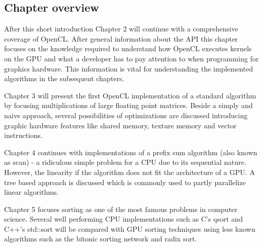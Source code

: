 \subsection{Chapter overview}

After this short introduction Chapter 2 will continue with a comprehensive coverage of OpenCL. After general information about the API this chapter focuses on the knowledge required to understand how OpenCL executes kernels on the GPU and what a developer has to pay attention to when programming for graphics hardware. This information is vital for understanding the implemented algorithms in the subsequent chapters.

Chapter 3 will present the first OpenCL implementation of a standard algorithm by focusing multiplications of large floating point matrices. Beside a simply and naive approach, several possibilities of optimizations are discussed introducing graphic hardware features like shared memory, texture memory and vector instructions.

Chapter 4 continues with implementations of a prefix sum algorithm (also known as scan) - a ridiculous simple problem for a CPU due to its sequential nature. However, the linearity if the algorithm does not fit the architecture of a GPU. A tree based approach is discussed which is commonly used to partly parallelize linear algorithms.

Chapter 5 focuses sorting as one of the most famous problems in computer science. Several well performing CPU implementations such as C's qsort and C++'s std::sort will be compared with GPU sorting techniques using less known algorithms such as the bitonic sorting network and radix sort.
